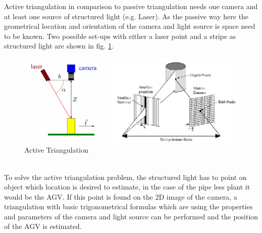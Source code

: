 Active triangulation in comparison to passive triangulation needs one camera and at least one source of structured light (e.g. Laser). As the passive way here the geometrical location and orientation of the camera and light source is space need to be known. Two possible set-ups with either a laser point and a stripe as structured light are shown in fig. \ref{ative_Triangulation}.
\begin{figure}[!htbp]
\centering
\includegraphics[width = 16cm]{Pictures/acticetriangulation}
\caption{Active Triangulation}
\label{ative_Triangulation}
\end{figure}\\
To solve the active triangulation problem, the structured light has to point on object which location is desired to estimate, in the case of the pipe less plant it would be the AGV. If this point is found on the 2D image of the camera, a triangulation with basic trigonometrical formulas which are using the properties and parameters of the camera and light source can be performed and the position of the AGV is estimated. 
